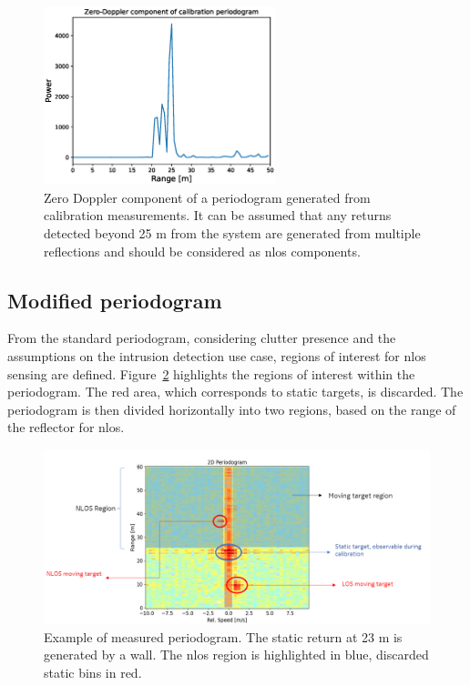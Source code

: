 			
			\begin{figure}[H]
				\centering
				\includegraphics[width=0.6\textwidth]{Images/Test1/cali_static_per_t1.eps}
				\caption{\small Zero Doppler component of a periodogram generated from calibration measurements. It can be assumed that any returns detected beyond 25 m from the system are generated from multiple reflections and should be considered as \gls{nlos} components. }
				\label{fig:Test1_cali_static_per}
			\end{figure}
		
	
		\subsection{Modified periodogram}
			
			From the standard periodogram, considering clutter presence and the assumptions on the intrusion detection use case, regions of interest for \gls{nlos} sensing are defined.		
			Figure~\ref{fig:Rad_nlos_los_separation} highlights the regions of interest within the periodogram.
			The red area, which corresponds to static targets, is discarded. The periodogram is then divided horizontally into two regions, based on the range of the reflector for \gls{nlos}.
			
			\begin{figure}[H]
				\centering
				\includegraphics[width=1.1\textwidth]{Images/Test1/nlos-los-separation.png}
				\caption{\small Example of measured periodogram.
					The static return at 23 m is generated by a wall.
					The \gls{nlos} region is highlighted in blue, discarded static bins in red.}
				\label{fig:Rad_nlos_los_separation}
			\end{figure}
			
